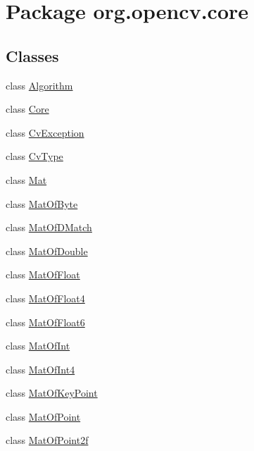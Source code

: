 \hypertarget{namespaceorg_1_1opencv_1_1core}{}\section{Package org.\+opencv.\+core}
\label{namespaceorg_1_1opencv_1_1core}
\subsection*{Classes}
\begin{DoxyCompactItemize}
\item 
class \mbox{\hyperlink{classorg_1_1opencv_1_1core_1_1_algorithm}{Algorithm}}
\item 
class \mbox{\hyperlink{classorg_1_1opencv_1_1core_1_1_core}{Core}}
\item 
class \mbox{\hyperlink{classorg_1_1opencv_1_1core_1_1_cv_exception}{Cv\+Exception}}
\item 
class \mbox{\hyperlink{classorg_1_1opencv_1_1core_1_1_cv_type}{Cv\+Type}}
\item 
class \mbox{\hyperlink{classorg_1_1opencv_1_1core_1_1_mat}{Mat}}
\item 
class \mbox{\hyperlink{classorg_1_1opencv_1_1core_1_1_mat_of_byte}{Mat\+Of\+Byte}}
\item 
class \mbox{\hyperlink{classorg_1_1opencv_1_1core_1_1_mat_of_d_match}{Mat\+Of\+D\+Match}}
\item 
class \mbox{\hyperlink{classorg_1_1opencv_1_1core_1_1_mat_of_double}{Mat\+Of\+Double}}
\item 
class \mbox{\hyperlink{classorg_1_1opencv_1_1core_1_1_mat_of_float}{Mat\+Of\+Float}}
\item 
class \mbox{\hyperlink{classorg_1_1opencv_1_1core_1_1_mat_of_float4}{Mat\+Of\+Float4}}
\item 
class \mbox{\hyperlink{classorg_1_1opencv_1_1core_1_1_mat_of_float6}{Mat\+Of\+Float6}}
\item 
class \mbox{\hyperlink{classorg_1_1opencv_1_1core_1_1_mat_of_int}{Mat\+Of\+Int}}
\item 
class \mbox{\hyperlink{classorg_1_1opencv_1_1core_1_1_mat_of_int4}{Mat\+Of\+Int4}}
\item 
class \mbox{\hyperlink{classorg_1_1opencv_1_1core_1_1_mat_of_key_point}{Mat\+Of\+Key\+Point}}
\item 
class \mbox{\hyperlink{classorg_1_1opencv_1_1core_1_1_mat_of_point}{Mat\+Of\+Point}}
\item 
class \mbox{\hyperlink{classorg_1_1opencv_1_1core_1_1_mat_of_point2f}{Mat\+Of\+Point2f}}

\end{DoxyCompactItemize}
